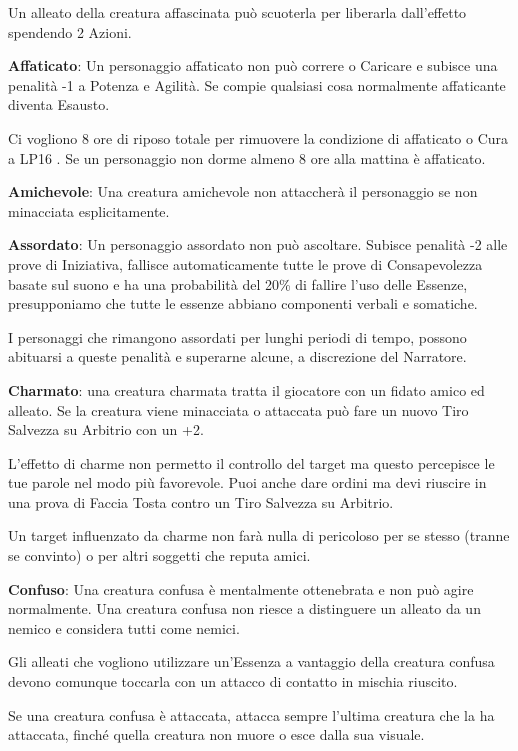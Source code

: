 \documentclass[a4paper,11pt,twoside,openany]{book}
\begin{document}
Un alleato della creatura affascinata può scuoterla per liberarla dall'effetto spendendo 2 Azioni.

\textbf{Affaticato}: Un personaggio affaticato non può correre o Caricare e subisce una penalità -1 a Potenza e Agilità. Se compie qualsiasi cosa normalmente affaticante diventa Esausto.

Ci vogliono 8 ore di riposo totale per rimuovere la condizione di affaticato o Cura a LP16 . Se un personaggio non dorme almeno 8 ore alla mattina è affaticato.

\textbf{Amichevole}: Una creatura amichevole non attaccherà il personaggio se non minacciata esplicitamente.

\textbf{Assordato}: Un personaggio assordato non può ascoltare. Subisce penalità -2 alle prove di Iniziativa, fallisce automaticamente tutte le prove di Consapevolezza basate sul suono e ha una probabilità del 20\% di fallire l'uso delle Essenze, presupponiamo che tutte le essenze abbiano componenti verbali e somatiche.

I personaggi che rimangono assordati per lunghi periodi di tempo, possono abituarsi a queste penalità e superarne alcune, a discrezione del Narratore.

\textbf{Charmato}: una creatura charmata tratta il giocatore con un fidato amico ed alleato. Se la creatura viene minacciata o attaccata può fare un nuovo Tiro Salvezza su Arbitrio con un +2.

L'effetto di charme non permetto il controllo del target ma questo percepisce le tue parole nel modo più favorevole. Puoi anche dare ordini ma devi riuscire in una prova di Faccia Tosta contro un Tiro Salvezza su Arbitrio.

Un target influenzato da charme non farà nulla di pericoloso per se stesso (tranne se convinto) o per altri soggetti che reputa amici.

\textbf{Confuso}: Una creatura confusa è mentalmente ottenebrata e non può agire normalmente. Una creatura confusa non riesce a distinguere un alleato da un nemico e considera tutti come nemici.

Gli alleati che vogliono utilizzare un'Essenza a vantaggio della creatura confusa devono comunque toccarla con un attacco di contatto in mischia riuscito.

Se una creatura confusa è attaccata, attacca sempre l'ultima creatura che la ha attaccata, finché quella creatura non muore o esce dalla sua visuale.
\end{document}
